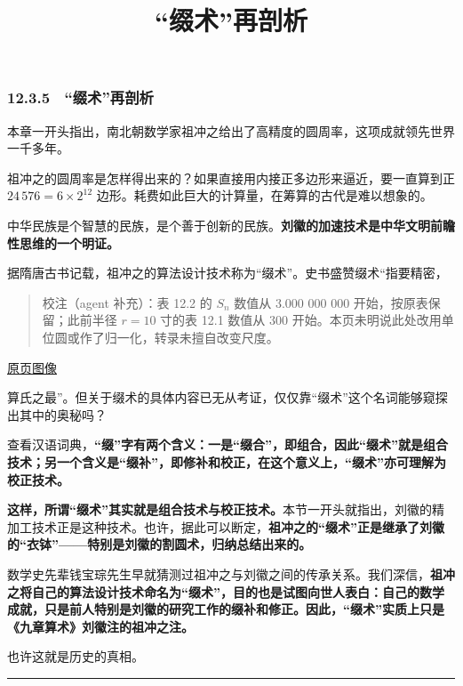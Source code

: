 \documentclass[
  10pt,
  fontset=fandol]{ctexart}
\title{``缀术''再剖析}
\author{}
\date{}
\begin{document}
\maketitle

\subsubsection{12.3.5　``缀术''再剖析}\label{ux7f00ux672fux518dux5256ux6790}

本章一开头指出，南北朝数学家祖冲之给出了高精度的圆周率，这项成就领先世界一千多年。

祖冲之的圆周率是怎样得出来的？如果直接用内接正多边形来逼近，要一直算到正 \(24\,576=6\times2^{12}\) 边形。耗费如此巨大的计算量，在筹算的古代是难以想象的。

中华民族是个智慧的民族，是个善于创新的民族。\textbf{刘徽的加速技术是中华文明前瞻性思维的一个明证。}

据隋唐古书记载，祖冲之的算法设计技术称为``缀术''。史书盛赞缀术``指要精密，

\begin{quote}
校注（agent 补充）：表 12.2 的 \(S_n\) 数值从 3.000 000 000 开始，按原表保留；此前半径 \(r=10\) 寸的表 12.1 数值从 300 开始。本页未明说此处改用单位圆或作了归一化，转录未擅自改变尺度。
\end{quote}

\href{../../source-images/pdf-302.jpeg}{原页图像}

算氏之最''。但关于缀术的具体内容已无从考证，仅仅靠``缀术''这个名词能够窥探出其中的奥秘吗？

查看汉语词典，\textbf{``缀''字有两个含义：一是``缀合''，即组合，因此``缀术''就是组合技术；另一个含义是``缀补''，即修补和校正，在这个意义上，``缀术''亦可理解为校正技术。}

\textbf{这样，所谓``缀术''其实就是组合技术与校正技术。}本节一开头就指出，刘徽的精加工技术正是这种技术。也许，据此可以断定，\textbf{祖冲之的``缀术''正是继承了刘徽的``衣钵''------特别是刘徽的割圆术，归纳总结出来的。}

数学史先辈钱宝琮先生早就猜测过祖冲之与刘徽之间的传承关系。我们深信，\textbf{祖冲之将自己的算法设计技术命名为``缀术''，目的也是试图向世人表白：自己的数学成就，只是前人特别是刘徽的研究工作的缀补和修正。因此，``缀术''实质上只是《九章算术》刘徽注的祖冲之注。}

也许这就是历史的真相。

\begin{center}\rule{0.5\linewidth}{0.5pt}\end{center}
\end{document}
